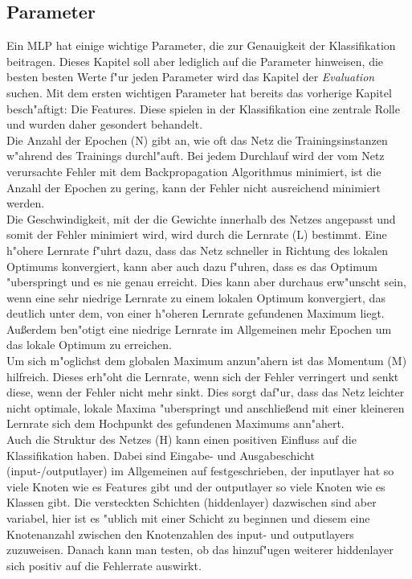 \subsection{Parameter}
\label{Parameter}
Ein MLP hat einige wichtige Parameter, die zur Genauigkeit der Klassifikation beitragen. Dieses Kapitel soll aber lediglich auf die Parameter hinweisen, die besten besten Werte f"ur jeden Parameter wird das Kapitel der \textit{Evaluation} suchen. Mit dem ersten wichtigen Parameter hat bereits das vorherige Kapitel besch"aftigt: Die Features. Diese spielen in der Klassifikation eine zentrale Rolle und wurden daher gesondert behandelt.\\
Die Anzahl der Epochen (N) gibt an, wie oft das Netz die Trainingsinstanzen w"ahrend des Trainings durchl"auft. Bei jedem Durchlauf wird der vom Netz verursachte Fehler mit dem Backpropagation Algorithmus minimiert, ist die Anzahl der Epochen zu gering, kann der Fehler nicht ausreichend minimiert werden. \\
Die Geschwindigkeit, mit der die Gewichte innerhalb des Netzes angepasst und somit der Fehler minimiert wird, wird durch die Lernrate (L) bestimmt. Eine h"ohere Lernrate f"uhrt dazu, dass das Netz schneller in Richtung des lokalen Optimums konvergiert, kann aber auch dazu f"uhren, dass es das Optimum "uberspringt und es nie genau erreicht. Dies kann aber durchaus erw"unscht sein, wenn eine sehr niedrige Lernrate zu einem lokalen Optimum konvergiert, das deutlich unter dem, von einer h"oheren Lernrate gefundenen Maximum liegt. Au{\ss}erdem ben"otigt eine niedrige Lernrate im Allgemeinen mehr Epochen um das lokale Optimum zu erreichen. \\
Um sich m"oglichst dem globalen Maximum anzun"ahern ist das Momentum (M) hilfreich. Dieses erh"oht die Lernrate, wenn sich der Fehler verringert und senkt diese, wenn der Fehler nicht mehr sinkt. Dies sorgt daf"ur, dass das Netz leichter nicht optimale, lokale Maxima "uberspringt und anschlie{\ss}end mit einer kleineren Lernrate sich dem Hochpunkt des gefundenen Maximums ann"ahert.\\
Auch die Struktur des Netzes (H) kann einen positiven Einfluss auf die Klassifikation haben. Dabei sind Eingabe- und Ausgabeschicht (input-/outputlayer) im Allgemeinen auf festgeschrieben, der inputlayer hat so viele Knoten wie es Features gibt und der outputlayer so viele Knoten wie es Klassen gibt. Die versteckten Schichten (hiddenlayer) dazwischen sind aber variabel, hier ist es "ublich mit einer Schicht zu beginnen und diesem eine Knotenanzahl zwischen den Knotenzahlen des input- und outputlayers zuzuweisen. Danach kann man testen, ob das hinzuf"ugen weiterer hiddenlayer sich positiv auf die Fehlerrate auswirkt.\\
